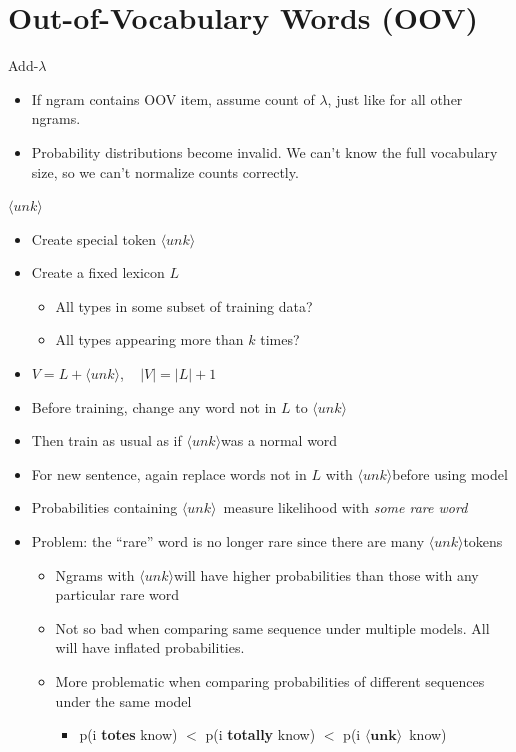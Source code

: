 \documentclass[11pt,letterpaper]{article}
\newcommand{\ngramunk}{\ensuremath{\langle unk \rangle}}
\begin{document}
\section{Out-of-Vocabulary Words (OOV)}

Add-$\lambda$

\begin{itemize}
  \item If ngram contains OOV item, assume count of $\lambda$, just like for all other ngrams.
  \item Probability distributions become invalid.  We can't know the full vocabulary size, so we can't normalize counts correctly.
\end{itemize}


\ngramunk

\begin{itemize}
  \item Create special token \ngramunk
  \item Create a fixed lexicon $L$
    \begin{itemize}
      \item All types in some subset of training data?
      \item All types appearing more than $k$ times?
    \end{itemize}
  \item $V = L + \ngramunk$, ~ $|V| = |L|+1$
  \item Before training, change any word not in $L$ to \ngramunk
  \item Then train as usual as if \ngramunk was a normal word
  \item For new sentence, again replace words not in $L$ with \ngramunk before using model
  \item Probabilities containing \ngramunk\ measure likelihood with \textit{some rare word}
  \item Problem: the ``rare'' word is no longer rare since there are many \ngramunk tokens
    \begin{itemize}
      \item Ngrams with \ngramunk will have higher probabilities than those with any particular rare word
      \item Not so bad when comparing same sequence under multiple models.  All will have inflated probabilities.
      \item More problematic when comparing probabilities of different sequences under the same model
        \begin{itemize}
          \item p(i \textbf{totes} know) $<$ p(i \textbf{totally} know) $<$ p(i $\mathbf{\langle unk \rangle}$\ know)
        \end{itemize}
    \end{itemize}
\end{itemize}
\end{document}
